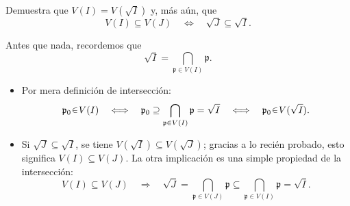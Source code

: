 \begin{ejer}
Demuestra que $V(I)=V(\sqrt{I})$ y, más aún, que
\[
V(I)\subseteq V(J)\quad\Longleftrightarrow\quad \sqrt{J}\subseteq\sqrt{I}.
\]
\end{ejer}
\begin{sol}
Antes que nada, recordemos que
\[
\sqrt{I}=\bigcap_{\mathfrak{p}\in V(I)}\mathfrak{p}.
\]
\begin{itemize}
    \item Por mera definición de intersección:
    \[
    \mathfrak{p}_0\en V(I)
    \quad\Longleftrightarrow\quad
    \mathfrak{p}_0\supseteq\bigcap_{\mathfrak{p}\in V(I)}\mathfrak{p}=\sqrt{I}
    \quad\Longleftrightarrow\quad
    \mathfrak{p}_0\en V(\sqrt{I}).
    \]

    \item Si $\sqrt{J}\subseteq\sqrt{I}$, se tiene $V(\sqrt{I})\subseteq V(\sqrt{J})$; gracias a lo recién probado, esto significa $V(I)\subseteq V(J)$. La otra implicación es una simple propiedad de la intersección:
    \[
    V(I)\subseteq V(J)
    \quad\Longrightarrow\quad
    \sqrt{J}=\bigcap_{\mathfrak{p}\in V(J)}\mathfrak{p}
    \subseteq\bigcap_{\mathfrak{p}\in V(I)}\mathfrak{p}=\sqrt{I}.
    \]
\end{itemize}
\end{sol}